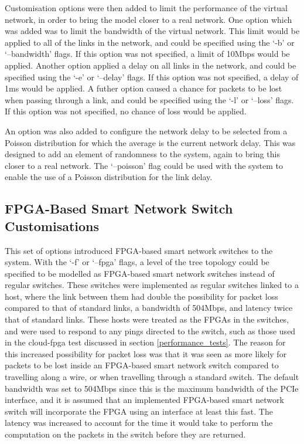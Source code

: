 {%
Customisation options were then added to limit the performance of the virtual network, in order to bring the model closer to a real network.
One option which was added was to limit the bandwidth of the virtual network.
This limit would be applied to all of the links in the network, and could be specified using the `-b' or `--bandwidth' flags.
If this option was not specified, a limit of 10Mbps would be applied.
Another option applied a delay on all links in the network, and could be specified using the `-e' or `--delay' flags.
If this option was not specified, a delay of 1ms would be applied.
A futher option caused a chance for packets to be lost when passing through a link, and could be specified using the `-l' or `--loss' flags.
If this option was not specified, no chance of loss would be applied.

An option was also added to configure the network delay to be selected from a Poisson distribution for which the average is the current network delay.
This was designed to add an element of randomness to the system, again to bring this closer to a real network.
The `--poisson' flag could be used with the system to enable the use of a Poisson distribution for the link delay.

\subsection{FPGA-Based Smart Network Switch Customisations}
\label{FPGA_Based_Smart_Network_Switch_Customisations}

This set of options introduced FPGA-based smart network switches to the system.
With the `-f' or `--fpga' flags, a level of the tree topology could be specified to be modelled as FPGA-based smart network switches instead of regular switches.
These switches were implemented as regular switches linked to a host, where the link between them had double the possibility for packet loss compared to that of standard links, a bandwidth of 504Mbps, and latency twice that of standard links.
These hosts were treated as the FPGAs in the switches, and were used to respond to any pings directed to the switch, such as those used in the cloud-fpga test discussed in section \ref{performance_tests}.
The reason for this increased possibility for packet loss was that it was seen as more likely for packets to be lost inside an FPGA-based smart network switch compared to travelling along a wire, or when travelling through a standard switch.
The default bandwidth was set to 504Mbps since this is the maximum bandwidth of the PCIe interface, and it is assumed that an implemented FPGA-based smart network switch will incorporate the FPGA using an interface at least this fast.
The latency was increased to account for the time it would take to perform the computation on the packets in the switch before they are returned.

}
